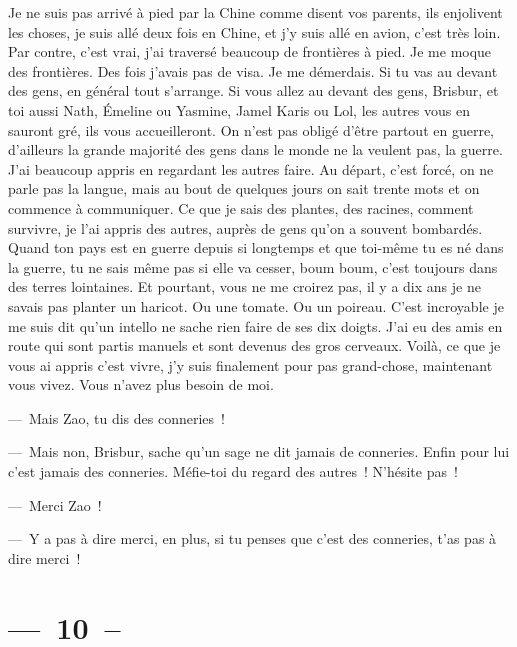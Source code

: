 \documentclass[french,twoside]{book} %
\begin{document}
\noindent Je ne suis pas arrivé à pied par la Chine comme disent vos parents, ils enjolivent les choses, je suis allé deux fois en Chine, et j’y suis allé en avion, c’est très loin. Par contre, c’est vrai, j’ai traversé beaucoup de frontières à pied. Je me moque des frontières. Des fois j’avais pas de visa. Je me démerdais. Si tu vas au devant des gens, en général tout s’arrange. Si vous allez au devant des gens, Brisbur, et toi aussi Nath, Émeline ou Yasmine, Jamel Karis ou Lol, les autres vous en sauront gré, ils vous accueilleront. On n’est pas obligé d’être partout en guerre, d’ailleurs la grande majorité des gens dans le monde ne la veulent pas, la guerre. J’ai beaucoup appris en regardant les autres faire. Au départ, c’est forcé, on ne parle pas la langue, mais au bout de quelques jours on sait trente mots et on commence à communiquer. Ce que je sais des plantes, des racines, comment survivre, je l’ai appris des autres, auprès de gens qu’on a souvent bombardés. Quand ton pays est en guerre depuis si longtemps et que toi-même tu es né dans la guerre, tu ne sais même pas si elle va cesser, boum boum, c’est toujours dans des terres lointaines. Et pourtant, vous ne me croirez pas, il y a dix ans je ne savais pas planter un haricot. Ou une tomate. Ou un poireau. C’est incroyable je me suis dit qu’un intello ne sache rien faire de ses dix doigts. J’ai eu des amis en route qui sont partis manuels et sont devenus des gros cerveaux. Voilà, ce que je vous ai appris c’est vivre, j’y suis finalement pour pas grand-chose, maintenant vous vivez. Vous n’avez plus besoin de moi.\par
— Mais Zao, tu dis des conneries !\par
— Mais non, Brisbur, sache qu’un sage ne dit jamais de conneries. Enfin pour lui c’est jamais des conneries. Méfie-toi du regard des autres ! N’hésite pas !\par
— Merci Zao !\par
— Y a pas à dire merci, en plus, si tu penses que c’est des conneries, t’as pas à dire merci !

\section[{— 10 –}]{— 10 –}
\renewcommand{\leftmark}{— 10 –}
\end{document}

